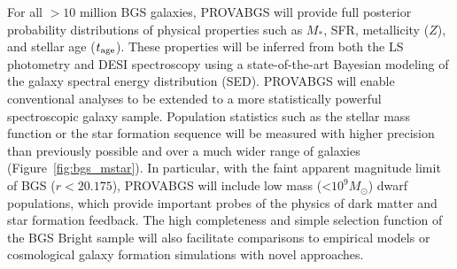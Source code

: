 
For all ${>}10$ million BGS galaxies, PROVABGS will provide full posterior
probability distributions of physical properties such as $M_*$, SFR,
metallicity ($Z$), and stellar age ($t_{\rm age}$). 
These properties will be inferred from both the LS photometry and DESI
spectroscopy using a state-of-the-art Bayesian modeling of the galaxy spectral
energy distribution (SED). 
PROVABGS will enable conventional analyses to be extended to a more
statistically powerful spectroscopic galaxy sample. 
Population statistics such as the stellar mass function or the star formation
sequence will be measured with higher precision than previously possible and
over a much wider range of galaxies (Figure~\ref{fig:bgs_mstar}). 
In particular, with the faint apparent magnitude limit of BGS ($r < 20.175$),
PROVABGS will include low mass (<$10^9M_\odot$) dwarf populations, which
provide important probes of the physics of dark matter and star formation
feedback.
The high completeness and simple selection function of the BGS Bright sample
will also facilitate comparisons to empirical models or cosmological galaxy 
formation simulations with novel approaches. 

